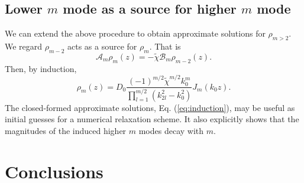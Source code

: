 \documentclass[apj]{emulateapj}
\newcommand{\Eq}[1]{Eq. (\ref{#1})}
\newcommand{\eq}[1]{\Eq{#1}}
\newcommand{\beq}{\begin{equation}}
\newcommand{\eeq}{\end{equation}}
\begin{document}
\subsection{Lower $m$ mode as a source for higher $m$ mode}
We can extend the above procedure to obtain approximate solutions for
$\rho_{m>2}$. We regard $\rho_{m-2}$ acts as a source for $\rho_{m}$. That is
\beq\label{eq:higherm}
\mathcal{A}_m\rho_m(z) = -\tilde{\chi}\mathcal{B}_m\rho_{m-2}(z). 
\eeq 
Then, by induction,
\beq\label{eq:induction}
\rho_m(z) =D_0
\frac{(-1)^{m/2}\tilde{\chi}^{m/2}k_0^m}{\prod_{l=1}^{m/2}(k_{2l}^2-k_0^2)}J_m(k_0z). 
\eeq
The closed-formed approximate solutions, \eq{eq:induction}, may be useful as initial
guesses for a numerical relaxation scheme. It also explicitly shows that the
magnitudes of the induced higher $m$ modes decay with $m$.  



\section{Conclusions}

\acknowledgments
\end{document}
